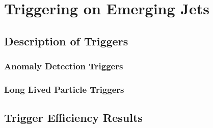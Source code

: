 \chapter{Triggering on Emerging Jets}

\section{Description of Triggers}

\subsection{Anomaly Detection Triggers}

\subsection{Long Lived Particle Triggers}

\section{Trigger Efficiency Results}
